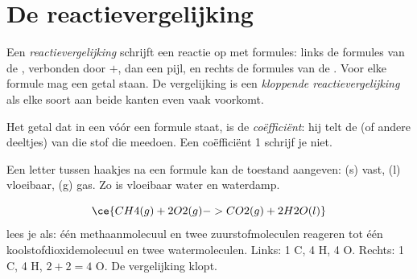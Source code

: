 \section{De reactievergelijking}

\begin{definition}[Reactievergelijking]\label{def:g8:balanced-equations:equation}
Een \emph{reactievergelijking} schrijft een
reactie op met formules: links de formules van de ,
verbonden door $+$, dan een pijl, en rechts de formules van de
. Voor elke formule mag een getal staan. De vergelijking
is een \emph{kloppende reactievergelijking}
als elke soort  aan beide kanten even vaak voorkomt.
\end{definition}

\begin{definition}[Coëfficiënt]\label{def:g8:balanced-equations:coefficient}
Het getal dat in een  vóór een formule staat, is de
\emph{coëfficiënt}: hij telt de  (of
andere deeltjes) van die stof die meedoen. Een coëfficiënt 1 schrijf je
niet.
\end{definition}

\begin{notation}[Toestandsaanduidingen]\label{not:g8:balanced-equations:states}
Een letter tussen haakjes na een formule kan de toestand aangeven:
(s) vast, (l) vloeibaar, (g) gas. Zo is  vloeibaar water en
 waterdamp.
\end{notation}

\begin{example}\label{ex:g8:balanced-equations:read}
\[
  \ce{CH4(g) + 2O2(g) -> CO2(g) + 2H2O(l)}
\]
lees je als: één methaanmolecuul en twee zuurstofmoleculen reageren tot
één koolstofdioxidemolecuul en twee watermoleculen. Links: 1 C, 4 H, 4 O.
Rechts: 1 C, 4 H, $2 + 2 = 4$ O. De vergelijking klopt.
\end{example}

